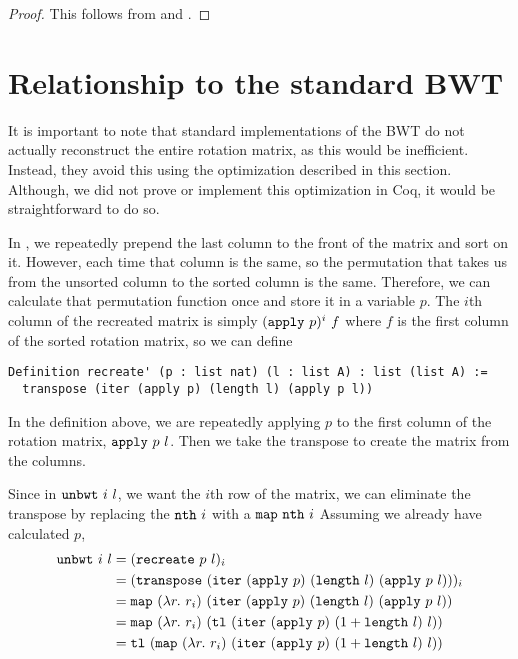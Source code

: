 \documentclass[sigplan,10pt,anonymous,review]{thesis}
\begin{document}
\radixsortcorrect
\begin{proof}
  This follows from  and .
\end{proof}

\section{Relationship to the standard BWT}
\label{sec:opt}

It is important to note that standard implementations of the BWT do
not actually reconstruct the entire rotation matrix, as this would be
inefficient. Instead, they avoid this using the optimization described
in this section. Although, we did not prove or implement this
optimization in Coq, it would be straightforward to do so.

In , we repeatedly prepend the last column to the front
of the matrix and sort on it. However, each time that column is the
same, so the permutation that takes us from the unsorted column to the
sorted column is the same. Therefore, we can calculate that
permutation function once and store it in a variable $p$. The $i$th
column of the recreated matrix is simply $(\texttt{apply}~p)^i~f$ where
$f$ is the first column of the sorted rotation matrix, so we can
define
\begin{lstlisting}
Definition recreate' (p : list nat) (l : list A) : list (list A) :=
  transpose (iter (apply p) (length l) (apply p l))
\end{lstlisting}
In the definition above, we are repeatedly applying $p$ to the
first column of the rotation matrix, $\texttt{apply}~p~l$. Then we
take the transpose to create the matrix from the columns.

Since in $\texttt{unbwt}~i~l$, we want the $i$th row of the matrix, we
can eliminate the transpose by replacing the $\texttt{nth}~i$ with a
$\texttt{map}~\texttt{nth}~i$ Assuming we already have calculated $p$,
\begin{align*}
   \texttt{unbwt}~i~l &= (\texttt{recreate}~p~l)_i \\
  &= (\texttt{transpose}~(\texttt{iter}~(\texttt{apply}~p)~(\texttt{length}~l)~(\texttt{apply}~p~l)))_i \\
  &= \texttt{map}~(\lambda
  r.~r_i)~(\texttt{iter}~(\texttt{apply}~p)~(\texttt{length}~l)~(\texttt{apply}~p~l)) \\
  &= \texttt{map}~(\lambda r.~r_i)~(\texttt{tl}~(\texttt{iter}~(\texttt{apply}~p)~(1 +
  \texttt{length}~l)~l)) \\
  &= \texttt{tl}~(\texttt{map}~(\lambda r.~r_i)~(\texttt{iter}~(\texttt{apply}~p)~(1 + \texttt{length}~l)~l))
\end{align*}
\end{document}
